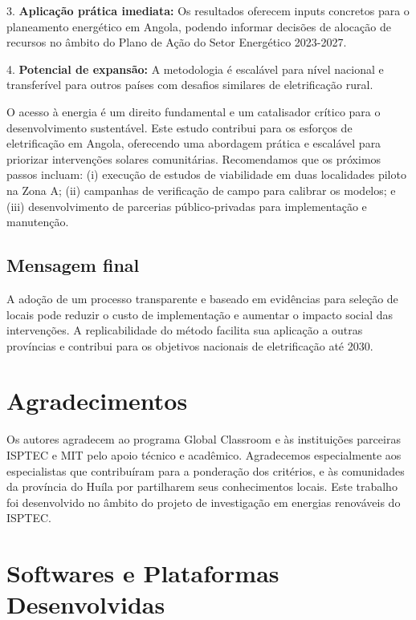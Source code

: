 \documentclass[12pt, a4paper]{article}
\begin{document}
3. \textbf{Aplicação prática imediata:} Os resultados oferecem inputs concretos para o planeamento energético em Angola, podendo informar decisões de alocação de recursos no âmbito do Plano de Ação do Setor Energético 2023-2027.

4. \textbf{Potencial de expansão:} A metodologia é escalável para nível nacional e transferível para outros países com desafios similares de eletrificação rural.

O acesso à energia é um direito fundamental e um catalisador crítico para o desenvolvimento sustentável. Este estudo contribui para os esforços de eletrificação em Angola, oferecendo uma abordagem prática e escalável para priorizar intervenções solares comunitárias. Recomendamos que os próximos passos incluam: (i) execução de estudos de viabilidade em duas localidades piloto na Zona A; (ii) campanhas de verificação de campo para calibrar os modelos; e (iii) desenvolvimento de parcerias público‑privadas para implementação e manutenção.

\subsection{Mensagem final}

A adoção de um processo transparente e baseado em evidências para seleção de locais pode reduzir o custo de implementação e aumentar o impacto social das intervenções. A replicabilidade do método facilita sua aplicação a outras províncias e contribui para os objetivos nacionais de eletrificação até 2030.

\section*{Agradecimentos}

Os autores agradecem ao programa Global Classroom e às instituições parceiras ISPTEC e MIT pelo apoio técnico e acadêmico. Agradecemos especialmente aos especialistas que contribuíram para a ponderação dos critérios, e às comunidades da província do Huíla por partilharem seus conhecimentos locais. Este trabalho foi desenvolvido no âmbito do projeto de investigação em energias renováveis do ISPTEC.




\section{Softwares e Plataformas Desenvolvidas}
\end{document}
